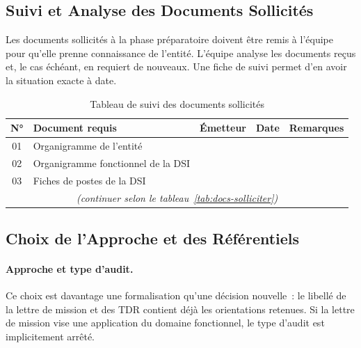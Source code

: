 \subsection{Suivi et Analyse des Documents Sollicités}
\label{subsec:suivi-docs}

Les documents sollicités à la phase préparatoire doivent être remis à l'équipe pour
qu'elle prenne connaissance de l'entité. L'équipe analyse les documents reçus et, le
cas échéant, en requiert de nouveaux. Une fiche de suivi permet d'en avoir la situation
exacte à date.

\begin{table}[H]
\centering
\small
\renewcommand{\arraystretch}{1.35}
\caption{Tableau de suivi des documents sollicités}
\label{tab:suivi-docs}
\begin{tabular}{|c|p{5.5cm}|p{2.5cm}|p{1.8cm}|p{2.5cm}|}
    \hline
    \rowcolor{gray!20}
    \textbf{N°} & \textbf{Document requis} &
    \textbf{Émetteur} & \textbf{Date} & \textbf{Remarques} \\ \hline
    01 & Organigramme de l'entité & & & \\ \hline
    02 & Organigramme fonctionnel de la DSI & & & \\ \hline
    03 & Fiches de postes de la DSI & & & \\ \hline
    \multicolumn{5}{|c|}{\textit{(continuer selon le tableau~\ref{tab:docs-solliciter})}} \\ \hline
\end{tabular}
\end{table}

\subsection{Choix de l'Approche et des Référentiels}
\label{subsec:choix-approche}

\paragraph{Approche et type d'audit.}
Ce choix est davantage une formalisation qu'une décision nouvelle~: le libellé de la
lettre de mission et des TDR contient déjà les orientations retenues. Si la lettre de
mission vise \og{}une application du domaine fonctionnel\fg{}, le type d'audit est
implicitement arrêté.

